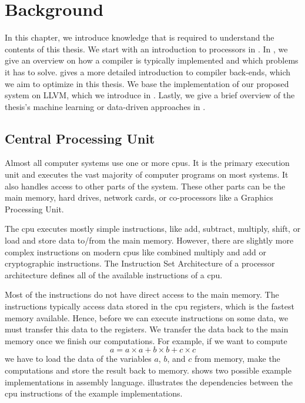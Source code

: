 \chapter{Background}
\label{sec:bg}
In this chapter, we introduce knowledge that is required to understand the contents of this thesis.
We start with an introduction to processors in .
In , we give an overview on how a compiler is typically implemented and which problems it has to solve.
 gives a more detailed introduction to compiler back-ends, which we aim to optimize in this thesis.
We base the implementation of our proposed system on LLVM, which we introduce in .
Lastly, we give a brief overview of the thesis's machine learning or data-driven approaches in .

\section{Central Processing Unit}
\label{sec:bg:cpu}
Almost all computer systems use one or more \acfp{cpu}.
It is the primary execution unit and executes the vast majority of computer programs on most systems.
It also handles access to other parts of the system.
These other parts can be the main memory, hard drives, network cards, or co-processors like a Graphics Processing Unit.

The \ac{cpu} executes mostly simple instructions, like add, subtract, multiply, shift, or load and store data to/from the main memory.
However, there are slightly more complex instructions on modern \acp{cpu} like combined multiply and add or cryptographic instructions.
The Instruction Set Architecture of a processor architecture defines all of the available instructions of a \ac{cpu}.

Most of the instructions do not have direct access to the main memory.
The instructions typically access data stored in the \ac{cpu} registers, which is the fastest memory available.
Hence, before we can execute instructions on some data, we must transfer this data to the registers.
We transfer the data back to the main memory once we finish our computations.
For example, if we want to compute 
\begin{equation}
    a=a\times a+b\times b+c\times c
    \label{eqn:bg:abc}
\end{equation}
we have to load the data of the variables $a$, $b$, and $c$ from memory, make the computations and store the result back to memory.
 shows two possible example implementations in assembly language.
 illustrates the dependencies between the \ac{cpu} instructions of the example implementations.

